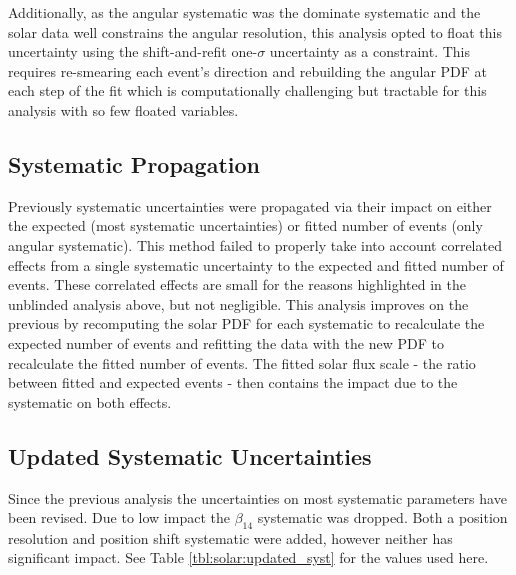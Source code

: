 Additionally, as the angular systematic was the dominate systematic and the solar data well constrains the angular resolution, this analysis opted to float this uncertainty using the shift-and-refit one-$\sigma$ uncertainty as a constraint.
This requires re-smearing each event's direction and rebuilding the angular PDF at each step of the fit which is computationally challenging but tractable for this analysis with so few floated variables.

\subsection{Systematic Propagation}
Previously systematic uncertainties were propagated via their impact on either the expected (most systematic uncertainties) or fitted number of events (only angular systematic). 
This method failed to properly take into account correlated effects from a single systematic uncertainty to the expected and fitted number of events.
These correlated effects are small for the reasons highlighted in the unblinded analysis above, but not negligible.
This analysis improves on the previous by recomputing the solar PDF for each systematic to recalculate the expected number of events and refitting the data with the new PDF to recalculate the fitted number of events.
The fitted solar flux scale - the ratio between fitted and expected events - then contains the impact due to the systematic on both effects.

\subsection{Updated Systematic Uncertainties}
Since the previous analysis the uncertainties on most systematic parameters have been revised. 
Due to low impact the $\beta_{14}$ systematic was dropped.
Both a position resolution and position shift systematic were added, however neither has significant impact.
See Table \ref{tbl:solar:updated_syst} for the values used here.

